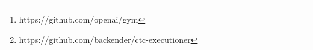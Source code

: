 \begin{abstract}
We have made use of the OpenAI Gym\footnote{https://github.com/openai/gym} library and contributed our work to the community\footnote{https://github.com/backender/ctc-executioner} to enable further investigations to be carried out.
The work done in this thesis can be used as a framework to (1) build a component that acts as an intermediary between trader and exchange and (2) to enable exchanges to provide a new order type to be used by traders.
\end{abstract}